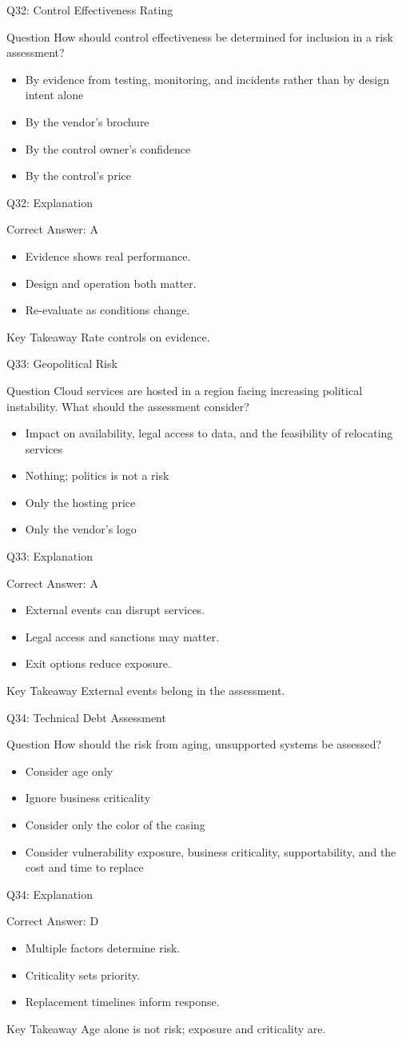 \documentclass[aspectratio=169]{beamer}
\newcommand{\hq}[7]{%
	\begin{frame}{Q#1: #2}
		\begin{block}{Question}
			#3
		\end{block}
		\begin{itemize}
			#4
		\end{itemize}
	\end{frame}
	\begin{frame}{Q#1: Explanation}
		\begin{block}{Correct Answer: #5}
			\begin{itemize}
				#6
			\end{itemize}
		\end{block}
		\begin{alertblock}{Key Takeaway}
			#7
		\end{alertblock}
	\end{frame}
}
\begin{document}
	\hq{32}{Control Effectiveness Rating}
	{How should control effectiveness be determined for inclusion in a risk assessment?}
	{\item[\textbf{(A)}] By evidence from testing, monitoring, and incidents rather than by design intent alone
		\item[\textbf{(B)}] By the vendor's brochure
		\item[\textbf{(C)}] By the control owner's confidence
		\item[\textbf{(D)}] By the control's price}
	{A}
	{\item Evidence shows real performance.
		\item Design and operation both matter.
		\item Re-evaluate as conditions change.}
	{Rate controls on evidence.}

	\hq{33}{Geopolitical Risk}
	{Cloud services are hosted in a region facing increasing political instability. What should the assessment consider?}
	{\item[\textbf{(A)}] Impact on availability, legal access to data, and the feasibility of relocating services
		\item[\textbf{(B)}] Nothing; politics is not a risk
		\item[\textbf{(C)}] Only the hosting price
		\item[\textbf{(D)}] Only the vendor's logo}
	{A}
	{\item External events can disrupt services.
		\item Legal access and sanctions may matter.
		\item Exit options reduce exposure.}
	{External events belong in the assessment.}

	\hq{34}{Technical Debt Assessment}
	{How should the risk from aging, unsupported systems be assessed?}
	{\item[\textbf{(A)}] Consider age only
		\item[\textbf{(B)}] Ignore business criticality
		\item[\textbf{(C)}] Consider only the color of the casing
		\item[\textbf{(D)}] Consider vulnerability exposure, business criticality, supportability, and the cost and time to replace}
	{D}
	{\item Multiple factors determine risk.
		\item Criticality sets priority.
		\item Replacement timelines inform response.}
	{Age alone is not risk; exposure and criticality are.}
\end{document}
